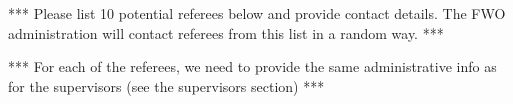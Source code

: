 \documentclass[11pt,dvipsnames,usenames,a4paper]{article}
\begin{document}


\vspace{10pt}
*** Please list 10 potential referees below and provide contact details.
The FWO administration will contact referees from this list in a random way. ***

*** For each of the referees, we need to provide the same administrative info as for the supervisors (see the supervisors section) ***
\end{document}
